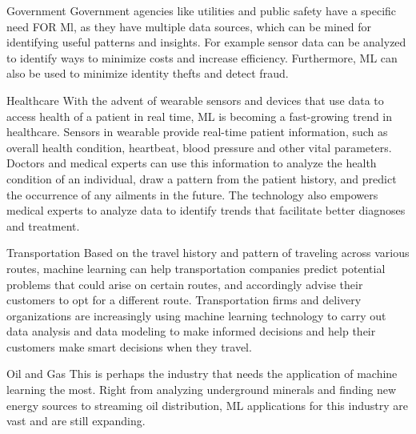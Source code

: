 \documentclass{beamer}
\begin{document}
\begin{frame}
\begin{block}{Government}
Government agencies like utilities and public safety have a specific need FOR Ml, as they have multiple data sources, which can be mined for identifying useful patterns and insights. For example sensor data can be analyzed to identify ways to minimize costs and increase efficiency. Furthermore, ML can also be used to minimize identity thefts and detect fraud.
\end{block}
\begin{block}{Healthcare}
With the advent of wearable sensors and devices that use data to access health of a patient in real time, ML is becoming a fast-growing trend in healthcare. Sensors in wearable provide real-time patient information, such as overall health condition, heartbeat, blood pressure and other vital parameters. Doctors and medical experts can use this information to analyze the health condition of an individual, draw a pattern from the patient history, and predict the occurrence of any ailments in the future. The technology also empowers medical experts to analyze data to identify trends that facilitate better diagnoses and treatment.
\end{block}
\end{frame}
\begin{frame}
    \begin{block}{Transportation}
    Based on the travel history and pattern of traveling across various routes, machine learning can help transportation companies predict potential problems that could arise on certain routes, and accordingly advise their customers to opt for a different route. Transportation firms and delivery organizations are increasingly using machine learning technology to carry out data analysis and data modeling to make informed decisions and help their customers make smart decisions when they travel.
    \end{block}
    \begin{block}{Oil and Gas}
    This is perhaps the industry that needs the application of machine learning the most. Right from analyzing underground minerals and finding new energy sources to streaming oil distribution, ML applications for this industry are vast and are still expanding.
    \end{block}
\end{frame}
\end{document}
